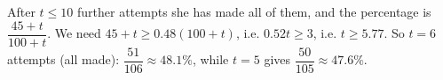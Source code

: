After $t\le10$ further attempts she has made all of them, and the percentage is $\dfrac{45+t}{100+t}$. We need $45+t\ge0.48(100+t)$, i.e. $0.52t\ge3$, i.e. $t\ge5.77$. So $t=\boxed{6}$ attempts (all made): $\dfrac{51}{106}\approx48.1\%$, while $t=5$ gives $\dfrac{50}{105}\approx47.6\%$.
